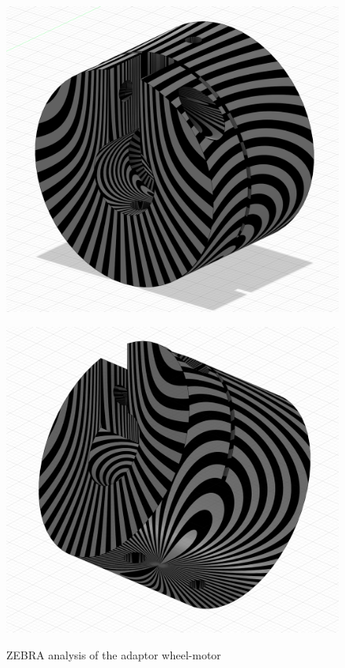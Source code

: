 \documentclass[11pt]{article}
\begin{document}
\begin{figure}[H]
    \centering
    \begin{minipage}{0.45\textwidth}
        \includegraphics[width=\textwidth]{images/ZEBRA/adaptor1.png}
        \label{fig:zebra_adaptor_wheel_motor}
    \end{minipage}
    \hfill
    \begin{minipage}{0.45\textwidth}
        \includegraphics[width=\textwidth]{images/ZEBRA/adaptor2.png}
        \label{fig:zebra_adaptor_wheel_motor2}
    \end{minipage}
    \caption{ZEBRA analysis of the adaptor wheel-motor}
\end{figure}
\end{document}
